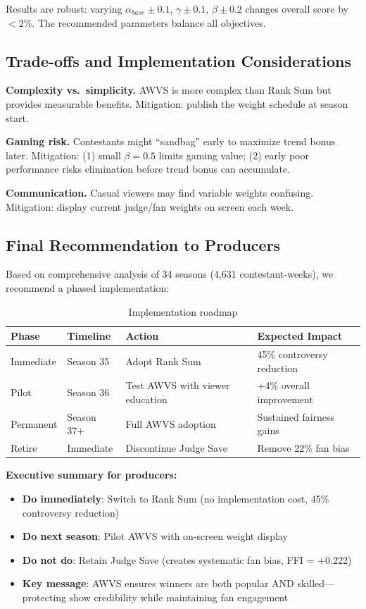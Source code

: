 \documentclass{mcmthesis}
\begin{document}
Results are robust: varying $\alpha_{base} \pm 0.1$, $\gamma \pm 0.1$, $\beta \pm 0.2$ changes overall score by $<2\%$. The recommended parameters balance all objectives.

\subsection{Trade-offs and Implementation Considerations}

\textbf{Complexity vs.\ simplicity.} AWVS is more complex than Rank Sum but provides measurable benefits. Mitigation: publish the weight schedule at season start.

\textbf{Gaming risk.} Contestants might ``sandbag'' early to maximize trend bonus later. Mitigation: (1) small $\beta = 0.5$ limits gaming value; (2) early poor performance risks elimination before trend bonus can accumulate.

\textbf{Communication.} Casual viewers may find variable weights confusing. Mitigation: display current judge/fan weights on screen each week.

\subsection{Final Recommendation to Producers}

Based on comprehensive analysis of 34 seasons (4,631 contestant-weeks), we recommend a phased implementation:

\begin{table}[h]
\centering
\caption{Implementation roadmap}
\begin{tabular}{l l l l}
\toprule
Phase & Timeline & Action & Expected Impact \\
\midrule
Immediate & Season 35 & Adopt Rank Sum & 45\% controversy reduction \\
Pilot & Season 36 & Test AWVS with viewer education & +4\% overall improvement \\
Permanent & Season 37+ & Full AWVS adoption & Sustained fairness gains \\
Retire & Immediate & Discontinue Judge Save & Remove 22\% fan bias \\
\bottomrule
\end{tabular}
\end{table}

\textbf{Executive summary for producers:}
\begin{itemize}
    \item \textbf{Do immediately}: Switch to Rank Sum (no implementation cost, 45\% controversy reduction)
    \item \textbf{Do next season}: Pilot AWVS with on-screen weight display
    \item \textbf{Do not do}: Retain Judge Save (creates systematic fan bias, FFI = +0.222)
    \item \textbf{Key message}: AWVS ensures winners are both popular AND skilled---protecting show credibility while maintaining fan engagement
\end{itemize}
\end{document}
